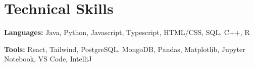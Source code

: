 
\section{Technical Skills}

\noindent \small {\textbf{Languages:} Java, Python, Javascript, Typescript, HTML/CSS, SQL, C++, R}

\noindent \small {\textbf{Tools:} React, Tailwind, PostgreSQL, MongoDB, Pandas, Matplotlib, Jupyter Notebook, VS Code, IntelliJ}



\vspace{-2mm}